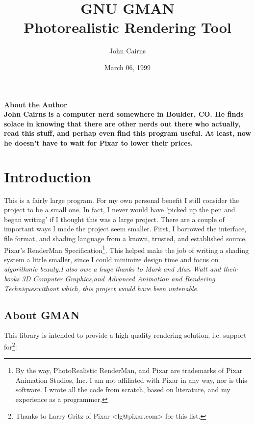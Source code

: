 \documentclass{book}	%
\title{GNU GMAN\\
Photorealistic Rendering Tool}
\author { John Cairns }
\date   { March 06, 1999 }
\begin{document}
\maketitle
\eject
\vfill
\vbox{
\hsize 3in
\bf About the Author\rm\\
John Cairns is a computer nerd somewhere in Boulder, CO.   He finds
solace in knowing that there are other nerds out there who actually,
read this stuff, and perhap even find this program useful.   At least,
now he doesn't have to wait for Pixar to lower their prices.
}

\tableofcontents
\chapter{Introduction}


This is a fairly large program.  For my own personal benefit I still
consider the project to be a small one.   In fact, I never would have
'picked up the pen and began writing' if I thought this was a large
project.   There are a couple of important ways I made the project seem
smaller.  First, I borrowed the interface, file format, and shading
language from a known, trusted, and established source, Pixar's
RenderMan Specification\footnote{By the way, PhotoRealistic RenderMan, 
and Pixar are trademarks of Pixar Animation Studios, Inc.   
I am not affiliated with Pixar in any way, nor is this software.   
I wrote all the code from scratch, based on literature, 
and my experience as a programmer.}.
This helped make the job of writing a shading system a little
smaller, since I could minimize design time and focus on
\em algorithmic beauty.\rm   I also owe a huge thanks to Mark and Alan
Watt and their books \em 3D Computer Graphics,\rm and Advanced
Animation and Rendering Techniques\rm without which, this project
would have been untenable.

\section{About GMAN}
This library is intended to provide a high-quality rendering solution,
i.e. support for\footnote{Thanks to Larry Gritz of Pixar <lg@pixar.com>
for this list.}:
\end{document}
